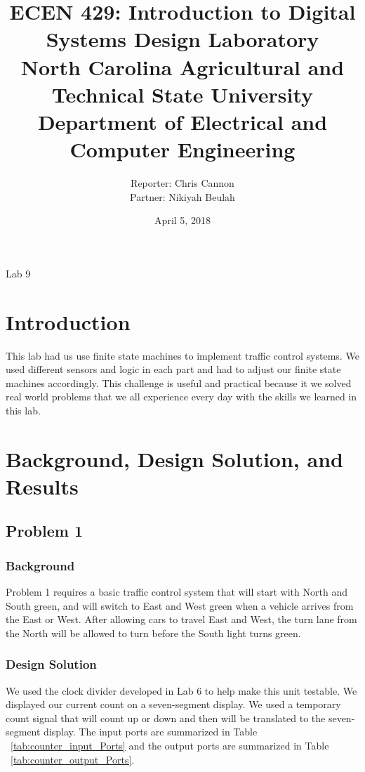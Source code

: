 \documentclass[11pt]{article}
\title {{\titleFont ECEN 429: Introduction to Digital Systems Design Laboratory \\ North Carolina Agricultural and Technical State University \\ Department of Electrical and Computer Engineering}} %
\author{\titleFont Reporter: Chris Cannon \\ \titleFont Partner: Nikiyah Beulah} %
\date{\titleFont April 5, 2018}
\begin{document}
\begin{titlingpage}
\maketitle
\begin{center}
	Lab 9
\end{center}
\end{titlingpage}

\section{Introduction}
This lab had us use finite state machines to implement traffic control systems. We used different sensors and logic in each part and had to adjust our finite state machines accordingly. This challenge is useful and practical because it we solved real world problems that we all experience every day with the skills we learned in this lab.

\section{Background, Design Solution, and Results}

\subsection{Problem 1 }

\subsubsection{Background}
Problem 1 requires a basic traffic control system that will start with North and South green, and will switch to East and West green when a vehicle arrives from the East or West. After allowing cars to travel East and West, the turn lane from the North will be allowed to turn before the South light turns green.

\subsubsection{Design Solution}
We used the clock divider developed in Lab 6 to help make this unit testable. We displayed our current count on a seven-segment display. We used a temporary count signal that will count up or down and then will be translated to the seven-segment display. The input ports are summarized in Table ~\ref{tab:counter_input_Ports} and the output ports are summarized in Table ~\ref{tab:counter_output_Ports}.
\end{document}
